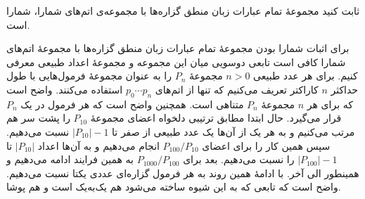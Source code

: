 ثابت کنید مجموعهٔ تمام عبارات زبان منطق گزاره‌ها با مجموعه‌ی اتم‌های شمارا، شمارا است.
\begin{ans}
  برای اثبات شمارا بودن مجموعهٔ تمام عبارات زبان منطق گزاره‌ها با مجموعهٔ اتم‌های شمارا کافی است تابعی دوسویی میان این مجموعه و مجموعهٔ اعداد طبیعی معرفی کنیم. برای هر عدد طبیعی 
  $n>0$
  مجموعهٔ
  $P_n$
  را به عنوان مجموعهٔ فرمول‌هایی با طول حداکثر $n$ کاراکتر تعریف می‌کنیم که تنها از اتم‌های
  $p_0\cdots p_n$
  استفاده می‌کنند. واضح است که برای هر $n$ مجموعهٔ $P_n$ متناهی است. همچنین واضح است که هر فرمول در یک $P_n$ قرار می‌گیرد.
  حال ابتدا مطابق ترتیبی دلخواه اعضای مجموعهٔ
  $P_{10}$
  را پشت سر هم مرتب می‌کنیم و به هر یک از آن‌ها یک عدد طبیعی از صفر تا $|P_{10}|-1$ نسبت می‌دهیم. سپس همین کار را برای اعضای $P_{100}/P_{10}$ انجام می‌دهیم و به آن‌ها اعداد $|P_{10}|$ تا $|P_{100}|-1$ را نسبت می‌دهیم. بعد برای $P_{1000}/P_{100}$ به همین فرایند ادامه می‌دهیم و همینطور الی آخر. با ادامهٔ همین روند به هر فرمول گزاره‌ای عددی یکتا نسبت می‌دهیم. واضح است که تابعی که به این شیوه ساخته می‌شود هم یک‌به‌یک است و هم پوشا.
\end{ans}
